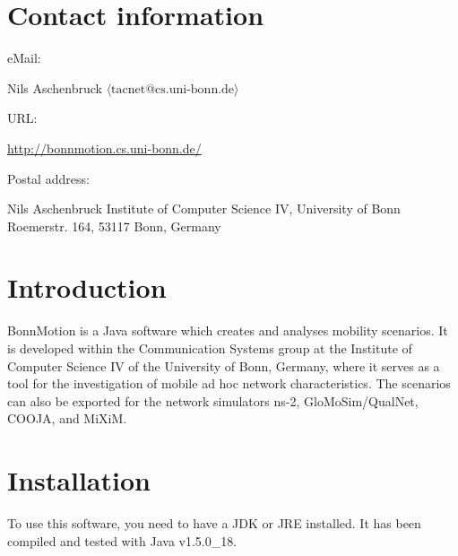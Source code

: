 \documentclass[11pt,a4paper,twoside,normalheadings,headsepline,DIV13,BCOR11mm,openright]{article}
\begin{document}
\section{Contact information}

eMail:
\par
\begingroup
\leftskip=0.5cm %
\noindent %
Nils Aschenbruck $\langle \textrm{tacnet@cs.uni-bonn.de} \rangle$
\par
\endgroup

\begingroup
\leftskip=0cm %
\noindent %
URL:
\par
\endgroup

\begingroup
\leftskip=0.5cm %
\noindent %
\url{http://bonnmotion.cs.uni-bonn.de/}
\par
\endgroup

\begingroup
\leftskip=0cm %
\noindent %
Postal address:
\par
\endgroup

\begingroup
\leftskip=0.5cm %
\noindent %
Nils Aschenbruck\newline
Institute of Computer Science IV, University of Bonn\newline
Roemerstr. 164, 53117 Bonn, Germany\newline
\par
\endgroup


\section{Introduction}


BonnMotion is a Java software which creates and analyses mobility
scenarios. It is developed within the Communication Systems group at
the Institute of Computer Science IV of the University of Bonn,
Germany, where it serves as a tool for the investigation of mobile ad
hoc network characteristics. The scenarios can also be exported for
the network simulators ns-2, GloMoSim/QualNet, COOJA, and MiXiM.


\section{Installation}


To use this software, you need to have a JDK or JRE  installed.  It  has
been compiled and tested with Java v1.5.0\_18.
\end{document}
